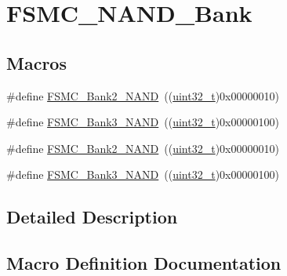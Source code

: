 \hypertarget{group___f_s_m_c___n_a_n_d___bank}{}\section{F\+S\+M\+C\+\_\+\+N\+A\+N\+D\+\_\+\+Bank}
\label{group___f_s_m_c___n_a_n_d___bank}
\subsection*{Macros}
\begin{DoxyCompactItemize}
\item 
\#define \hyperlink{group___f_s_m_c___n_a_n_d___bank_ga294e7134aa329a09e56b61eec9882a27}{F\+S\+M\+C\+\_\+\+Bank2\+\_\+\+N\+A\+ND}~((\hyperlink{_p_e___types_8h_a33594304e786b158f3fb30289278f5af}{uint32\+\_\+t})0x00000010)
\item 
\#define \hyperlink{group___f_s_m_c___n_a_n_d___bank_gaf72def0732c026b0245d721ee371c85b}{F\+S\+M\+C\+\_\+\+Bank3\+\_\+\+N\+A\+ND}~((\hyperlink{_p_e___types_8h_a33594304e786b158f3fb30289278f5af}{uint32\+\_\+t})0x00000100)
\item 
\#define \hyperlink{group___f_s_m_c___n_a_n_d___bank_ga294e7134aa329a09e56b61eec9882a27}{F\+S\+M\+C\+\_\+\+Bank2\+\_\+\+N\+A\+ND}~((\hyperlink{_p_e___types_8h_a33594304e786b158f3fb30289278f5af}{uint32\+\_\+t})0x00000010)
\item 
\#define \hyperlink{group___f_s_m_c___n_a_n_d___bank_gaf72def0732c026b0245d721ee371c85b}{F\+S\+M\+C\+\_\+\+Bank3\+\_\+\+N\+A\+ND}~((\hyperlink{_p_e___types_8h_a33594304e786b158f3fb30289278f5af}{uint32\+\_\+t})0x00000100)
\end{DoxyCompactItemize}


\subsection{Detailed Description}


\subsection{Macro Definition Documentation}
